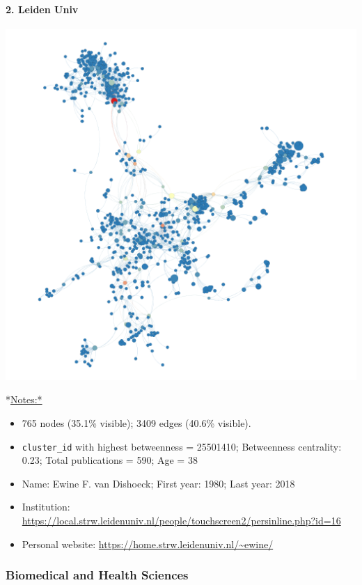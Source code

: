 \documentclass[]{article}
\providecommand{\tightlist}{%
  \setlength{\itemsep}{0pt}\setlength{\parskip}{0pt}}
\let\oldparagraph\paragraph
\renewcommand{\paragraph}[1]{\oldparagraph{#1}\mbox{}}
\begin{document}
\paragraph{2. Leiden Univ}\label{leiden-univ}

\includegraphics{figs/lu_phys_betweenness.png}

*\url{Notes:*}

\begin{itemize}
\tightlist
\item
  765 nodes (35.1\% visible); 3409 edges (40.6\% visible).
\item
  \texttt{cluster\_id} with highest betweenness = 25501410; Betweenness
  centrality: 0.23; Total publications = 590; Age = 38
\item
  Name: Ewine F. van Dishoeck; First year: 1980; Last year: 2018
\item
  Institution:
  \url{https://local.strw.leidenuniv.nl/people/touchscreen2/persinline.php?id=16}
\item
  Personal website: \url{https://home.strw.leidenuniv.nl/~ewine/}
\end{itemize}

\subsubsection{Biomedical and Health
Sciences}\label{biomedical-and-health-sciences}
\end{document}
